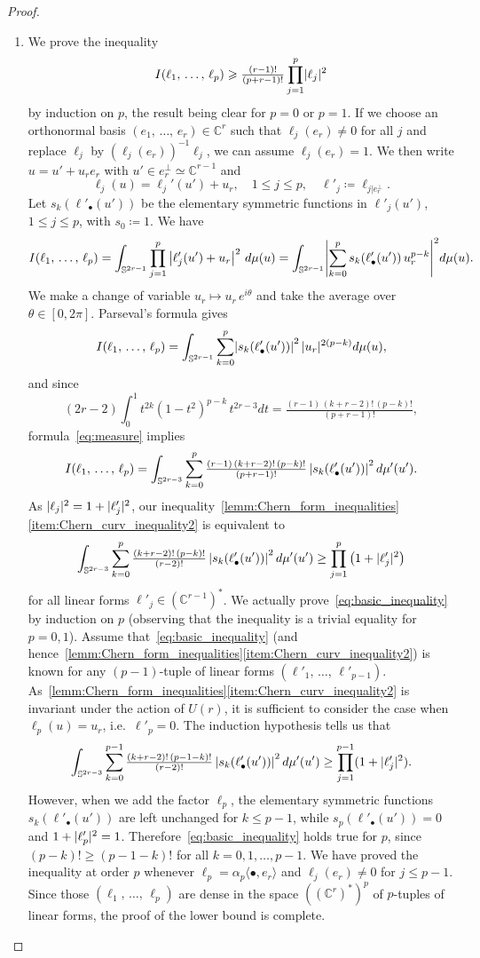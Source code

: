 \documentclass[10pt,a4paper]{amsart}
\numberwithin{equation}{section}
\DeclarePairedDelimiter{\abs}{\lvert}{\rvert}
\newcommand*\bC{\mathbb{C}}
\newcommand*\bS{\mathbb{S}}
\let\leq\leqslant
\let\geq\geqslant
\newcommand*\bydef{\coloneqq}
\theoremstyle{definition}\newtheorem{defi}[theo]{Definition}
\theoremstyle{remark}\newtheorem{rema}[theo]{Remark}
\begin{document}
\begin{proof}
\begin{enumerate}
\item We prove the inequality
\[
I(\ell_1,\,\dotsc,\,\ell_p)\geq \tfrac{(r-1)!}{(p+r-1)!}\prod_{j=1}^p\abs{\ell_j}^2
\]
by induction on $p$, the result being clear for $p=0$ or $p=1$. If we choose an orthonormal basis $(e_1,\,\dotsc,\,e_r)\in\bC^r$ such that
$\ell_j(e_r)\ne 0$ for all $j$ and replace $\ell_j$ by
$(\ell_j(e_r))^{-1}\ell_j$, we can assume $\ell_j(e_r)=1$. We then write $u=u'+u_re_r$ with $u'\in e_r^\perp\simeq\bC^{r-1}$ and
\[
\ell_j(u)=\ell_j'(u')+u_r,\quad 1\leq j\leq p,\quad\ell'_j
\bydef
\ell_{j|e_r^\perp}.
\]
Let $s_k(\ell'_\bullet(u'))$ be the elementary symmetric functions in $\ell'_j(u')$, $1\leq j\leq p$, with $s_0\bydef1$. We have
\[
I(\ell_1,\,\dotsc,\,\ell_p) =\int_{\bS^{2r-1}}\prod_{j=1}^p\left|\ell'_j(u')+u_r\right|^2\,d\mu(u) =\int_{\bS^{2r-1}}
\abs*{\sum_{k=0}^ps_k(\ell'_\bullet(u'))\,u_r^{p-k}}^2 d\mu(u).
\]
We make a change of variable $u_r\mapsto u_r\,e^{i\theta}$ and take the average over $\theta\in[0,2\pi]$. Parseval's formula gives
\[
I(\ell_1,\,\dotsc,\,\ell_p) =\int_{\bS^{2r-1}}\sum_{k=0}^p\abs*{s_k(\ell'_\bullet(u'))}^2\,\abs{u_r}^{2(p-k)} d\mu(u),
\]
and since
\[
(2r-2)\int_0^1t^{2k}(1-t^2)^{p-k}\,t^{2r-3}dt=
\tfrac{(r-1)\,(k+r-2)!\,(p-k)!}{(p+r-1)!},
\]
formula~\eqref{eq:measure} implies
\[
I(\ell_1,\,\dotsc,\,\ell_p) =\int_{\bS^{2r-3}}\sum_{k=0}^p\tfrac{(r-1)\,(k+r-2)!\,(p-k)!}{(p+r-1)!}\,
\abs*{s_k(\ell'_\bullet(u'))}^2\,d\mu'(u').
\]
As $\abs{\ell_j}^2=1+\abs{\ell'_j}^2$, our inequality~\ref{lemm:Chern_form_inequalities}\eqref{item:Chern_curv_inequality2} is equivalent to
\begin{equation}\label{eq:basic_inequality}
\int_{\bS^{2r-3}}\sum_{k=0}^p\tfrac{(k+r-2)!\,(p-k)!}{(r-2)!}\,
\abs*{s_k(\ell'_\bullet(u'))}^2\,d\mu'(u')\ge
\prod_{j=1}^p\left(1+\abs{\ell'_j}^2\right)
\end{equation}
for all linear forms $\ell'_j\in(\bC^{r-1})^*$. We actually prove~\eqref{eq:basic_inequality} by induction on $p$ (observing that the inequality is a trivial equality for $p=0,1$). Assume that~\eqref{eq:basic_inequality} (and hence~\ref{lemm:Chern_form_inequalities}\eqref{item:Chern_curv_inequality2}) is known for any $(p-1)$-tuple of linear forms $(\ell'_1,\,\dotsc,\,\ell'_{p-1})$. As~\ref{lemm:Chern_form_inequalities}\eqref{item:Chern_curv_inequality2} is invariant under the action of $U(r)$, it is sufficient to consider the case when $\ell_p(u)=u_r$, i.e.\ $\ell'_p=0$. The induction hypothesis tells us that
\[
\int_{\bS^{2r-3}}\sum_{k=0}^{p-1}\tfrac{(k+r-2)!\,(p-1-k)!}{(r-2)!}\,
\abs*{s_k(\ell'_\bullet(u'))}^2\,d\mu'(u')\ge
\prod_{j=1}^{p-1}(1+\abs{\ell'_j}^2).
\]
However, when we add the factor $\ell_p$, the elementary symmetric functions $s_k(\ell'_\bullet(u'))$ are left unchanged for $k\leq p-1$, while
$s_p(\ell'_\bullet(u'))=0$ and $1+\abs{\ell'_p}^2=1$. Therefore~\eqref{eq:basic_inequality} holds true for $p$, since $(p-k)!\geq (p-1-k)!$ for all $k=0,1,\dotsc,p-1$. We have proved the inequality at order $p$ whenever
$\ell_p=\alpha_p\langle\bullet,e_r\rangle$ and $\ell_j(e_r)\ne 0$ for $j\leq p-1$. Since those $(\ell_1,\,\dotsc,\,\ell_p)$ are dense in the space $((\bC^r)^*)^p$ of $p$-tuples of linear forms, the proof of the lower bound is complete.


\end{enumerate}
\end{proof}
\end{document}
